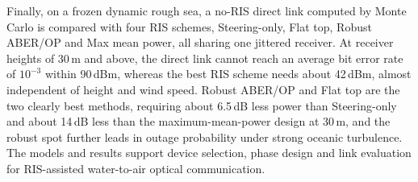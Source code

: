 \begin{englishabstract}
Finally, on a frozen dynamic rough sea, a no-RIS direct link computed by Monte Carlo is compared with four RIS schemes, Steering-only, Flat top, Robust ABER/OP and Max mean power, all sharing one jittered receiver. At receiver heights of 30\,m and above, the direct link cannot reach an average bit error rate of $10^{-3}$ within 90\,dBm, whereas the best RIS scheme needs about 42\,dBm, almost independent of height and wind speed. Robust ABER/OP and Flat top are the two clearly best methods, requiring about 6.5\,dB less power than Steering-only and about 14\,dB less than the maximum-mean-power design at 30\,m, and the robust spot further leads in outage probability under strong oceanic turbulence. The models and results support device selection, phase design and link evaluation for RIS-assisted water-to-air optical communication.

\end{englishabstract}
